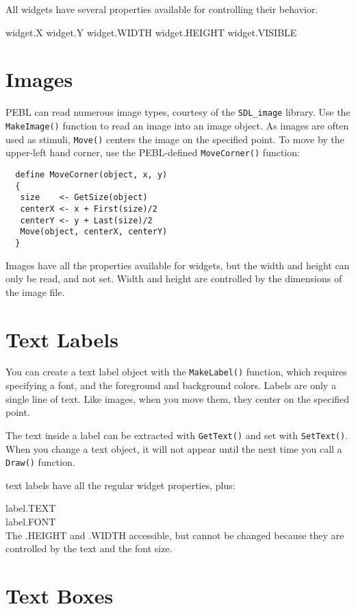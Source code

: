 All widgets have several properties available for controlling their
behavior.


  widget.X
  widget.Y
  widget.WIDTH
  widget.HEIGHT
  widget.VISIBLE


\section{Images}

PEBL can read numerous image types, courtesy of the
\texttt{SDL\_image} library.  Use the \texttt{MakeImage()} function to
read an image into an image object.  As images are often used as
stimuli, \texttt{Move()} centers the image on the specified point.  To
move by the upper-left hand corner, use the PEBL-defined
\texttt{MoveCorner()} function:
\begin{verbatim}
  define MoveCorner(object, x, y)
  {
   size    <- GetSize(object)
   centerX <- x + First(size)/2
   centerY <- y + Last(size)/2
   Move(object, centerX, centerY)
  }
\end{verbatim}

Images have all the properties available for widgets, but the width
and height can only be read, and not set.  Width and height are
controlled by the dimensions of the image file.


\section{Text Labels}

You can create a text label object with the \texttt{MakeLabel()} function, 
which requires specifying a font, and the foreground and background colors.  Labels are only a single line of text. Like images, when you move them,
they center on the specified point.

The text inside a label can be extracted with \texttt{GetText()} 
and set with \texttt{SetText()}. When you change a text object, 
it will not appear until the next time you call a \texttt{Draw()} function.

text labels have all the regular widget properties, plus:

 label.TEXT \\
 label.FONT \\


The .HEIGHT and .WIDTH accessible, but cannot be changed because they
are controlled by the text and the font size.


\section{Text Boxes}

